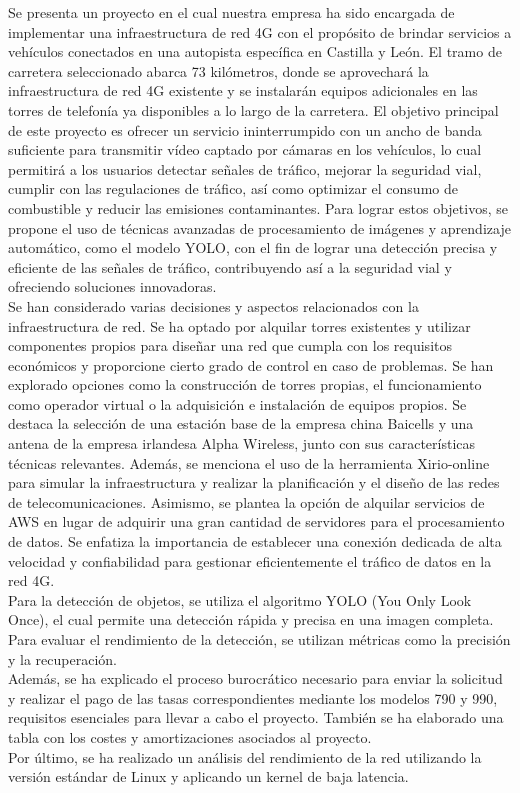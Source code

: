 Se presenta un proyecto en el cual nuestra empresa ha sido encargada de implementar una infraestructura de red 4G con el propósito de brindar servicios a vehículos conectados en una autopista específica en Castilla y León. El tramo de carretera seleccionado abarca 73 kilómetros, donde se aprovechará la infraestructura de red 4G existente y se instalarán equipos adicionales en las torres de telefonía ya disponibles a lo largo de la carretera. El objetivo principal de este proyecto es ofrecer un servicio ininterrumpido con un ancho de banda suficiente para transmitir vídeo captado por cámaras en los vehículos, lo cual permitirá a los usuarios detectar señales de tráfico, mejorar la seguridad vial, cumplir con las regulaciones de tráfico, así como optimizar el consumo de combustible y reducir las emisiones contaminantes. Para lograr estos objetivos, se propone el uso de técnicas avanzadas de procesamiento de imágenes y aprendizaje automático, como el modelo YOLO, con el fin de lograr una detección precisa y eficiente de las señales de tráfico, contribuyendo así a la seguridad vial y ofreciendo soluciones innovadoras.\\

Se han considerado varias decisiones y aspectos relacionados con la infraestructura de red. Se ha optado por alquilar torres existentes y utilizar componentes propios para diseñar una red que cumpla con los requisitos económicos y proporcione cierto grado de control en caso de problemas. Se han explorado opciones como la construcción de torres propias, el funcionamiento como operador virtual o la adquisición e instalación de equipos propios. Se destaca la selección de una estación base de la empresa china Baicells y una antena de la empresa irlandesa Alpha Wireless, junto con sus características técnicas relevantes. Además, se menciona el uso de la herramienta Xirio-online para simular la infraestructura y realizar la planificación y el diseño de las redes de telecomunicaciones. Asimismo, se plantea la opción de alquilar servicios de AWS en lugar de adquirir una gran cantidad de servidores para el procesamiento de datos. Se enfatiza la importancia de establecer una conexión dedicada de alta velocidad y confiabilidad para gestionar eficientemente el tráfico de datos en la red 4G.\\

Para la detección de objetos, se utiliza el algoritmo YOLO (You Only Look Once), el cual permite una detección rápida y precisa en una imagen completa. Para evaluar el rendimiento de la detección, se utilizan métricas como la precisión y la recuperación.\\

Además, se ha explicado el proceso burocrático necesario para enviar la solicitud y realizar el pago de las tasas correspondientes mediante los modelos 790 y 990, requisitos esenciales para llevar a cabo el proyecto. También se ha elaborado una tabla con los costes y amortizaciones asociados al proyecto.\\

Por último, se ha realizado un análisis del rendimiento de la red utilizando la versión estándar de Linux y aplicando un kernel de baja latencia.